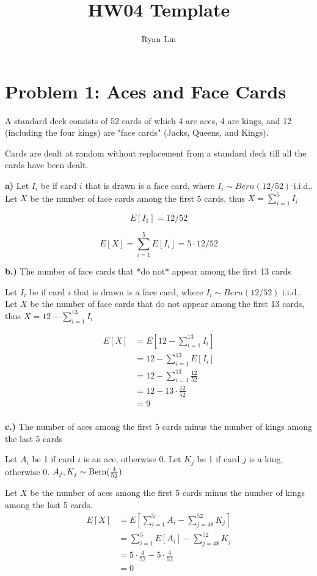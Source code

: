 \documentclass{report}
\title{HW04 Template}
\author{Ryan Lin}
\date{}
\begin{document}
\maketitle
\section*{Problem 1: Aces and Face Cards}

A standard deck consists of 52 cards of which 4 are aces, 4 are kings, and 12 (including the four kings) are "face cards" (Jacks, Queens, and Kings).

Cards are dealt at random without replacement from a standard deck till all the cards have been dealt. 


\noindent
\textbf{a)} Let $I_i$ be if card $i$ that is drawn is a face card, where $I_i \sim Bern(12/52)$ i.i.d.. Let $X$ be the number of face cards among the first 5 cards, thus $X = \sum_{i=1}^{5} I_i$

$$E[I_1] = 12/52$$

$$E[X] = \sum_{i=1}^5 E[I_i] = 5 \cdot 12/52$$


\noindent
\textbf{b.)} The number of face cards that *do not* appear among the first 13 cards


Let $I_i$ be if card $i$ that is drawn is a face card, where $I_i \sim Bern(12/52)$ i.i.d.. Let $X$ be the number of face cards that do not appear among the first 13 cards, thus $X = 12 - \sum_{i=1}^{13} I_i$

\begin{align*}
	E[X] &= E[12 - \sum_{i=1}^{13} I_i] \\
	&= 12 - \sum_{i=1}^{13}E[I_i] \\
	&= 12 - \sum_{i=1}^{13} \frac{12}{52} \\
	&= 12 - 13 \cdot \frac{12}{52} \\
	&= 9 \\
\end{align*}


\noindent
\textbf{c.)} The number of aces among the first 5 cards minus the number of kings among the last 5 cards

Let $ A_i$ be 1 if card $ i $ is an ace, otherwise 0. Let $ K_j $ be 1 if card $ j $ is a king, otherwise 0. $ A_j, K_j \sim \operatorname{Bern}(\frac{4}{52})  $ 

Let $ X $ be the number of aces among the first 5 cards minus the number of kings among the last 5 cards.
\begin{align*}
	E[X] &= E[\sum_{i=1}^{5} A_i - \sum_{j=48}^{52} K_j] \\
&= \sum_{i=1}^{5} E[A_i] - \sum_{j=48}^{52} K_j \\
&= 5 \cdot \frac{4}{52} - 5 \cdot \frac{4}{52} \\
&= 0 \\
\end{align*}
\end{document}
